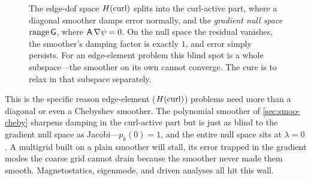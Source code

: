 \begin{figure}[t]
\centering
{}
\caption[The gradient null space a plain smoother misses]{The edge-dof space
$H(\mathrm{curl})$ splits into the curl-active part, where a diagonal smoother damps error
normally, and the \emph{gradient null space} $\operatorname{range}\mathsf{G}$, where
$\mathsf{A}\,\nabla\psi=0$. On the null space the residual vanishes, the smoother's
damping factor is exactly $1$, and error simply persists. For an edge-element
problem this blind spot is a whole subspace---the smoother on its own cannot
converge. The cure is to relax in that subspace separately.}
\label{fig:smoo-nullspace}
\end{figure}

\begin{pitfall}
This is the specific reason edge-element ($H(\mathrm{curl})$) problems need more than a
diagonal or even a Chebyshev smoother. The polynomial smoother of
\cref{sec:smoo-cheby} sharpens damping in the curl-active part but is just as blind
to the gradient null space as Jacobi---$p_k(0)=1$, and the entire null space sits at
$\lambda=0$. A multigrid built on a plain smoother will stall, its error trapped in
the gradient modes the coarse grid cannot drain because the smoother never made
them smooth. Magnetostatics, eigenmode, and driven analyses all hit this wall.
\end{pitfall}

